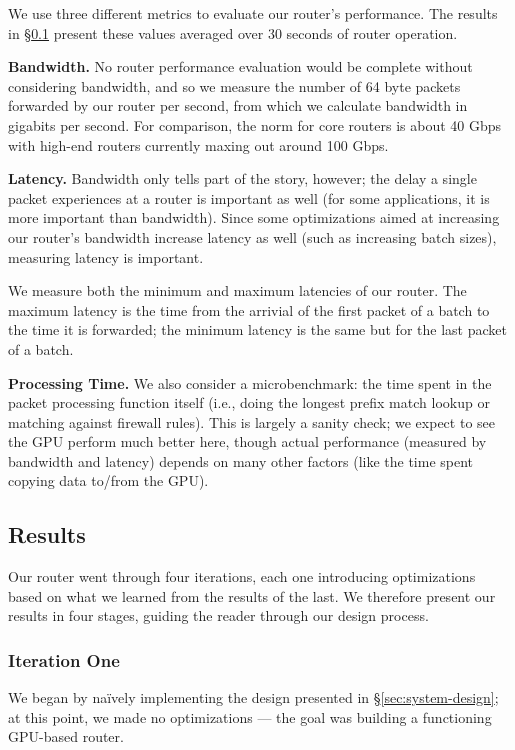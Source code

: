We use three different metrics to evaluate our router's performance. The results
in \S\ref{sec:results} present these values averaged over 30 seconds of router
operation.

\medskip \noindent \textbf{Bandwidth.} No router performance evaluation would
be complete without considering bandwidth, and so we measure the number of 64
byte packets forwarded by our router per second, from which we calculate
bandwidth in gigabits per second. For comparison, the norm for core routers is
about 40 Gbps with high-end routers currently maxing out around 100 Gbps.

\medskip \noindent \textbf{Latency.} Bandwidth only tells part of the story,
however; the delay a single packet experiences at a router is important as well
(for some applications, it is more important than bandwidth). Since some
optimizations aimed at increasing our router's bandwidth increase latency as
well (such as increasing batch sizes), measuring latency is important.

We measure both the minimum and maximum latencies of our router. The maximum
latency is the time from the arrivial of the first packet of a batch to the
time it is forwarded; the minimum latency is the same but for the last packet
of a batch.

\medskip \noindent \textbf{Processing Time.} We also consider a microbenchmark:
the time spent in the packet processing function itself (i.e., doing the longest
prefix match lookup or matching against firewall rules). This is largely a
sanity check; we expect to see the GPU perform much better here, though actual
performance (measured by bandwidth and latency) depends on many other factors
(like the time spent copying data to/from the GPU).


\subsection{Results}
\label{sec:results}

Our router went through four iterations, each one introducing optimizations
based on what we learned from the results of the last. We therefore present our
results in four stages, guiding the reader through our design process.

\subsubsection{Iteration One}

We began by na\"{i}vely implementing the design presented in
\S\ref{sec:system-design}; at this point, we made no optimizations --- the goal
was building a functioning GPU-based router.

